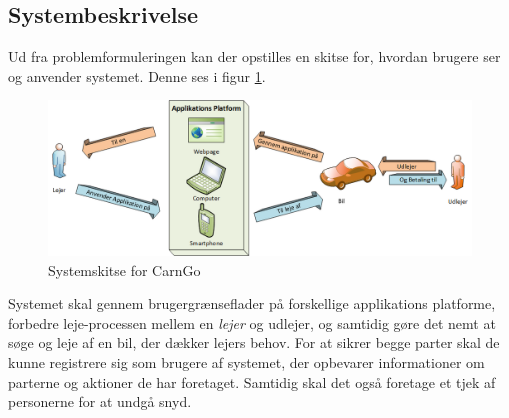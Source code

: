 \documentclass[a4paper,12pt,fleqn,oneside]{article}
\begin{document}
\subsection{Systembeskrivelse}
Ud fra problemformuleringen kan der opstilles en skitse for, hvordan brugere ser og anvender systemet. Denne ses i figur \ref{fig:Systemskitse}.

\begin{figure}[H]
    \centering
    \includegraphics[width=\textwidth]{Projektformulering/graphic/SystemSkitsePRJ4.png}
    \caption{Systemskitse for CarnGo}
    \label{fig:Systemskitse}
\end{figure}

Systemet skal gennem brugergrænseflader på forskellige applikations platforme, forbedre leje-processen mellem en \textit{lejer} og udlejer, og samtidig gøre det nemt at søge og leje af en bil, der dækker lejers behov. For at sikrer begge parter skal de kunne registrere sig som brugere af systemet, der opbevarer informationer om parterne og aktioner de har foretaget. Samtidig skal det også foretage et tjek af personerne for at undgå snyd.
\end{document}
